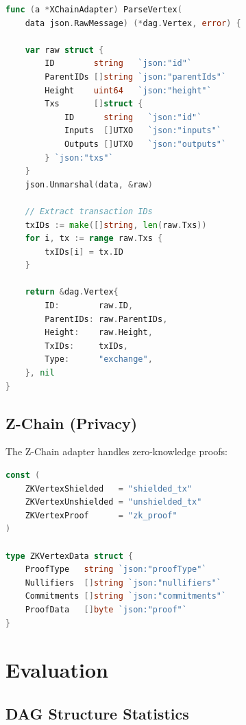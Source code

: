 \documentclass[11pt,twocolumn]{article}
\begin{document}
\begin{lstlisting}[language=Go,caption={X-Chain vertex parsing}]
func (a *XChainAdapter) ParseVertex(
    data json.RawMessage) (*dag.Vertex, error) {

    var raw struct {
        ID        string   `json:"id"`
        ParentIDs []string `json:"parentIds"`
        Height    uint64   `json:"height"`
        Txs       []struct {
            ID      string   `json:"id"`
            Inputs  []UTXO   `json:"inputs"`
            Outputs []UTXO   `json:"outputs"`
        } `json:"txs"`
    }
    json.Unmarshal(data, &raw)

    // Extract transaction IDs
    txIDs := make([]string, len(raw.Txs))
    for i, tx := range raw.Txs {
        txIDs[i] = tx.ID
    }

    return &dag.Vertex{
        ID:        raw.ID,
        ParentIDs: raw.ParentIDs,
        Height:    raw.Height,
        TxIDs:     txIDs,
        Type:      "exchange",
    }, nil
}
\end{lstlisting}

\subsection{Z-Chain (Privacy)}

The Z-Chain adapter handles zero-knowledge proofs:

\begin{lstlisting}[language=Go,caption={Z-Chain vertex types}]
const (
    ZKVertexShielded   = "shielded_tx"
    ZKVertexUnshielded = "unshielded_tx"
    ZKVertexProof      = "zk_proof"
)

type ZKVertexData struct {
    ProofType   string `json:"proofType"`
    Nullifiers  []string `json:"nullifiers"`
    Commitments []string `json:"commitments"`
    ProofData   []byte `json:"proof"`
}
\end{lstlisting}

\section{Evaluation}

\subsection{DAG Structure Statistics}
\end{document}
